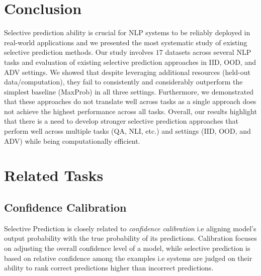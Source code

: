 \documentclass[11pt]{article}
\begin{document}
\section{Conclusion}
Selective prediction ability is crucial for NLP systems to be reliably deployed in real-world applications and we presented the most systematic study of existing selective prediction methods.
Our study involves $17$ datasets across several NLP tasks and evaluation of existing selective prediction approaches in IID, OOD, and ADV settings.
We showed that despite leveraging additional resources (held-out data/computation), they fail to consistently and considerably outperform the simplest baseline (MaxProb) in all three settings.
Furthermore, we demonstrated that these approaches do not translate well across tasks as a single approach does not achieve the highest performance across all tasks.
Overall, our results highlight that there is a need to develop stronger selective prediction approaches that perform well across multiple tasks (QA, NLI, etc.) and settings (IID, OOD, and ADV) while being computationally efficient. 





\newpage

\appendix

\section{Related Tasks}
\label{sec:related_tasks}
\subsection{Confidence Calibration}
\label{sec:background}
Selective Prediction is closely related to \textit{confidence calibration} \cite{platt1999probabilistic} i.e aligning model's output probability with the true probability of its predictions. 
Calibration focuses on adjusting the overall confidence level of a model, while selective prediction is based on relative confidence among the examples i.e systems are judged on their ability to rank correct predictions higher than incorrect predictions.
\end{document}
